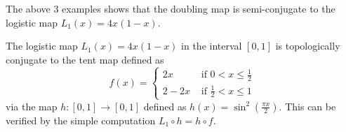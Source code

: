 \begin{example}\label{ex_logistic_and_doubling}
	The above 3 examples shows that the doubling map is semi-conjugate to the logistic map $L_1(x) = 4x(1-x)$.
\end{example}

\begin{example}
	The logistic map $L_1(x) = 4x(1-x)$ in the interval $[0,1]$ is topologically conjugate to the tent map defined as 
	\begin{equation}
		f(x) = 
		\begin{cases}
			2x   &\text{ if } 0<x \leq \frac{1}{2} \\ 
			2-2x &\text{ if } \frac{1}{2} < x \leq 1
		\end{cases}
	\end{equation}
	via the map $h: [0,1] \rightarrow [0,1]$ defined as $h(x) = \sin^2(\frac{\pi x}{2})$.
	This can be verified by the simple computation $L_1 \circ h = h \circ f$.
\end{example}
